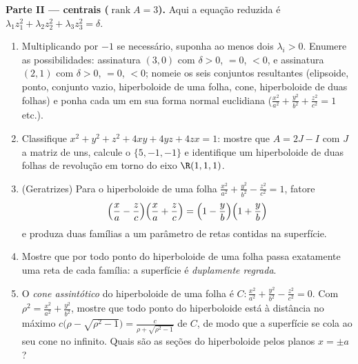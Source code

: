 \begin{problem}
\medskip
\noindent\textbf{Parte II ---  centrais
($\operatorname{rank}A = 3$).} Aqui a equação reduzida é
$\lambda_1z_1^2 + \lambda_2z_2^2 + \lambda_3z_3^2 = \delta$.
\begin{enumerate}[resume]
  \item Multiplicando por $-1$ se necessário, suponha ao menos dois
        $\lambda_i > 0$. Enumere as possibilidades:
        assinatura $(3, 0)$ com $\delta > 0$, $= 0$, $< 0$,
        e assinatura $(2, 1)$ com $\delta > 0$, $= 0$, $<
        0$; nomeie os seis conjuntos resultantes (elipsoide, ponto,
        conjunto vazio, hiperboloide de uma folha, cone, hiperboloide
        de duas folhas) e ponha cada um em sua forma normal
        euclidiana ($\frac{x^2}{a^2} + \frac{y^2}{b^2} +
        \frac{z^2}{c^2} = 1$ etc.).
  \item Classifique $x^2 + y^2 + z^2 + 4xy + 4yz + 4zx = 1$:
        mostre que $A = 2J - I$ com $J$ a matriz de uns,
        calcule o  $\{5, -1, -1\}$ e identifique um
        hiperboloide de duas folhas de revolução em torno do eixo
        $\R(1,1,1)$.
  \item (Geratrizes) Para o hiperboloide de uma folha
        $\frac{x^2}{a^2} + \frac{y^2}{b^2} - \frac{z^2}{c^2}
        = 1$, fatore
        \[
        \Bigl(\frac xa - \frac zc\Bigr)
        \Bigl(\frac xa + \frac zc\Bigr)
        = \Bigl(1 - \frac yb\Bigr)\Bigl(1 + \frac yb\Bigr)
        \]
        e produza duas famílias a um parâmetro de retas
        contidas na superfície.
  \item Mostre que por todo ponto do hiperboloide de uma
        folha passa exatamente uma reta de cada família:
        a superfície é \emph{duplamente regrada}.
  \item O \emph{cone assintótico} do hiperboloide de uma
        folha é $C : \frac{x^2}{a^2} + \frac{y^2}{b^2}
        - \frac{z^2}{c^2} = 0$. Com $\rho^2 = \frac{x^2}{a^2}
        + \frac{y^2}{b^2}$, mostre que todo ponto do
        hiperboloide está à distância no máximo $c\bigl(\rho -
        \sqrt{\rho^2 - 1}\bigr) = \frac{c}{\rho +
        \sqrt{\rho^2 - 1}}$ de $C$, de modo que a superfície se cola ao
        seu cone no infinito. Quais são as seções do
        hiperboloide pelos planos $x = \pm a$?
\end{enumerate}


\end{problem}
